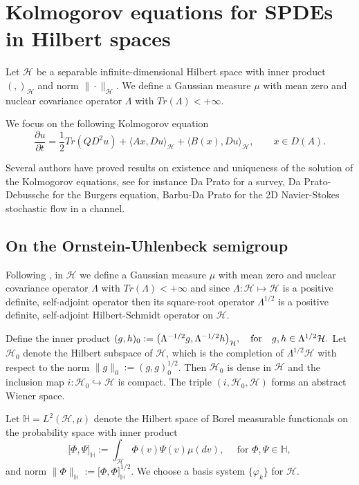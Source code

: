\documentclass[review,onefignum,onetabnum]{siamart190516}
\begin{document}
\section{Kolmogorov equations for SPDEs in Hilbert spaces}\label{fpk-sect}
    Let $\mathcal{H}$ be a separable infinite-dimensional Hilbert space with
inner product $( ,  )_\mathcal{H} $ and norm $\|\cdot\|_\mathcal{H}$. We define
a Gaussian measure $\mu$ with mean zero and nuclear covariance operator
$\Lambda$ with  $Tr(\Lambda)<+\infty$.

    We focus on the following Kolmogorov equation
\begin{equation}
    \label{P1s2.3}
    \frac{\partial u}{\partial t}= \frac{1}{2}Tr(QD^2u)+ \langle Ax, Du
    \rangle_\mathcal{H} + \langle B(x),Du \rangle_\mathcal{H},\qquad x\in D(A).
\end{equation}

    Several authors have proved results on existence and uniqueness of the
solution of the Kolmogorov equations, see for instance Da Prato \cite{da} for a
survey, Da Prato-Debussche \cite{da-de} for the Burgers equation,  Barbu-Da
Prato \cite{ba-da} for the 2D Navier-Stokes stochastic flow in a channel.
%
\subsection{On the Ornstein-Uhlenbeck semigroup}\label{OUS-sect}
    Following \cite{liu},  in $\mathcal{H}$ we define a Gaussian measure $\mu$
with mean zero and nuclear covariance operator $\Lambda$ with
${Tr(\Lambda)<+\infty}$ and since $\Lambda:\mathcal{H}\mapsto \mathcal{H}$ is a
positive definite, self-adjoint operator then its square-root operator
$\Lambda^{1/2}$ is a positive definite, self-adjoint Hilbert-Schmidt operator
on $\mathcal{H}$.

    Define the inner product
$
    ( g, h )_0 := 
    \big( 
        \Lambda^{-1/2}g ,
        \Lambda^{-1/2} h
    \big)_\mathcal{H},
    \quad 
    \hbox{\rm for}
    \quad g, h \in 
    \Lambda^{1/2} 
    \mathcal{H}.
$
Let $\mathcal{H}_0$ denote the Hilbert subspace of $\mathcal{H}$, which is the
completion of $\Lambda^{1/2} \mathcal{H}$ with
respect to the norm $\|g\|_0:= ( g, g )_0^{1/2} $. Then ${\mathcal{H}_0}$ is
dense in $\mathcal{H}$ and the inclusion map
$i:\mathcal{H}_0\hookrightarrow\mathcal{H}$ is compact. The triple
$(i,\mathcal{H}_0,\mathcal{H})$ forms an abstract Wiener space.

    Let
$
    \mathbb{H} = L^2 (\mathcal{H}, \mu)
$
denote the Hilbert space of Borel
measurable functionals on the probability space with inner
product
\[
    \big[ 
        \Phi,
        \Psi
    \big]_\mathbb{H}
    :=
        \int_{\mathcal{H}} 
        \Phi(v)
        \Psi(v)\mu(dv),\quad
        \text{ for } 
        \Phi,\Psi\in\mathbb{H},
\]
and norm $\|\Phi\|_{\mathbb{H}}:=\big [\Phi,\Phi\big ]_\mathbb{H}^{1/2}$.
We choose a basis system $\{\varphi_k\}$ for $\mathcal{H}$.
\end{document}
